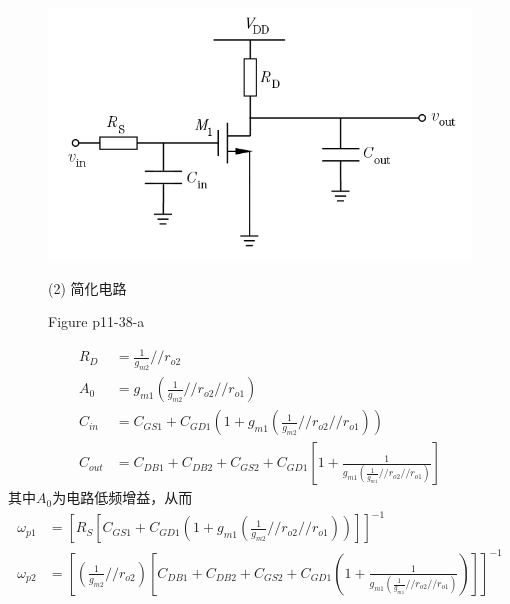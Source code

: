 \documentclass[hyperref, UTF8]{ctexart}
\newcommand{\under}[1]{\frac{1}{#1}}
\begin{document}
\begin{figure}[!htb]
        \begin{minipage}[t]{0.442\textwidth}
        \centering
        \includegraphics[width=1\textwidth]{p11-38-a-sol2.png}
        \caption*{(2) 简化电路}
        \end{minipage}
        \caption*{Figure p11-38-a}
    \end{figure}        
    \begin{align*}
        R_D & = \under{g_{m2}}//r_{o2} \\
        A_0 & = g_{m1}\left(\under{g_{m2}}//r_{o2}//r_{o1}\right) \\
        C_{in} & = C_{GS1} + C_{GD1}\left(1+g_{m1}\left(\under{g_{m2}}//r_{o2}//r_{o1}\right)\right) \\
        C_{out} & = C_{DB1}+C_{DB2}+C_{GS2}+C_{GD1}\left[1+\under{g_{m1}\left(\under{g_{m1}} // r_{o2} // r_{o1}\right)}\right]
    \end{align*}
    其中$A_0$为电路低频增益，从而
    \begin{align*}
        \omega_{p1} & = \left[R_S \left[ C_{GS1} + C_{GD1}\left(1+g_{m1}\left(\under{g_{m2}}//r_{o2}//r_{o1}\right)\right)\right] \right] ^ {-1} \\
        \omega_{p2} & = \left[\left(\under{g_{m2}} // r_{o2}\right)\left[C_{DB1}+C_{DB2}+C_{GS2}+C_{GD1}\left(1+\under{g_{m1}\left(\under{g_{m1}} // r_{o2} // r_{o1}\right)}\right)\right]\right] ^ {-1}
    \end{align*}
\end{document}
